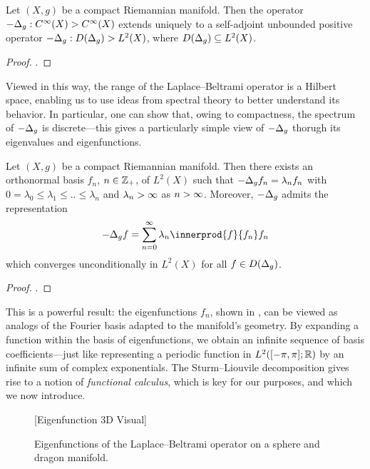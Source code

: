 \documentclass[11pt]{book}
\begin{document}
\begin{result}
Let $(X,g)$ be a compact Riemannian manifold.
Then the operator $-\Delta_g : C^\infty(X) \-> C^\infty(X)$ extends uniquely to a self-adjoint unbounded positive operator $-\Delta_g: D(\Delta_g) \-> L^2(X)$, where $D(\Delta_g) \subseteq L^2(X)$.
\end{result}

\begin{proof}
\textcite[Theorem 2.4]{strichartz83}.
\end{proof}

Viewed in this way, the range of the Laplace--Beltrami operator is a Hilbert space, enabling us to use ideas from spectral theory to better understand its behavior.
In particular, one can show that, owing to compactness, the spectrum of $-\Delta_g$ is discrete---this gives a particularly simple view of $-\Delta_g$ thorugh its eigenvalues and eigenfunctions.

\begin{result}
Let $(X,g)$ be a compact Riemannian manifold.
Then there exists an orthonormal basis $f_n$, $n\in\mathbb{Z}_+$, of $L^2(X)$ such that $-\Delta_g f_n = \lambda_n f_n$ with $0 = \lambda_0 \leq \lambda_1 \leq .. \leq \lambda_n$ and $\lambda_n\-> \infty$ as $n\->\infty$.
Moreover, $-\Delta_g$ admits the representation
\[
-\lap_g f = \sum_{n=0}^\infty \lambda_n \innerprod{f}{f_n} f_n
\]
which converges unconditionally in $L^2(X)$ for all $f \in D(\Delta_g)$.
\end{result}

\begin{proof}
\textcite[139]{chavel84}.
\end{proof}

This is a powerful result: the eigenfunctions $f_n$, shown in , can be viewed as analogs of the Fourier basis adapted to the manifold's geometry.
By expanding a function within the basis of eigenfunctions, we obtain an infinite sequence of basis coefficients---just like representing a periodic function in $L^2([-\pi,\pi];\mathbb{R})$ by an infinite sum of complex exponentials.
The Sturm--Liouvile decomposition gives rise to a notion of \emph{functional calculus}, which is key for our purposes, and which we now introduce.


\begin{figure}
\vspace*{10ex}
[Eigenfunction 3D Visual]
\vspace*{10ex}
\caption{Eigenfunctions of the Laplace--Beltrami operator on a sphere and dragon manifold.}
\label{fig:eig-s2-dr}
\end{figure}
\end{document}

